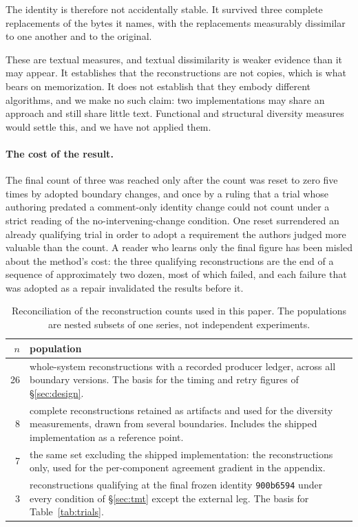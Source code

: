\documentclass[10pt,twocolumn]{article}
\begin{document}
The identity is therefore not accidentally stable. It survived three
complete replacements of the bytes it names, with the replacements
measurably dissimilar to one another and to the original.

These are textual measures, and textual dissimilarity is weaker evidence
than it may appear. It establishes that the reconstructions are not
copies, which is what bears on memorization. It does not establish that
they embody different algorithms, and we make no such claim: two
implementations may share an approach and still share little text.
Functional and structural diversity measures would settle this, and we
have not applied them.

\paragraph{The cost of the result.} The final count of three was reached
only after the count was reset to zero five times by adopted boundary
changes, and once by a ruling that a trial whose authoring predated a
comment-only identity change could not count under a strict reading of
the no-intervening-change condition. One reset surrendered an already
qualifying trial in order to adopt a requirement the authors judged more
valuable than the count. A reader who learns only the final figure has
been misled about the method's cost: the three qualifying reconstructions
are the end of a sequence of approximately two dozen, most of which
failed, and each failure that was adopted as a repair invalidated the
results before it.

\begin{table}[t]
\centering\small
\caption{Reconciliation of the reconstruction counts used in this
paper. The populations are nested subsets of one series, not independent
experiments.}
\label{tab:accounting}
\begin{tabular}{@{}rp{}@{}}
\toprule
$n$ & population \\
\midrule
26 & whole-system reconstructions with a recorded producer ledger,
     across all boundary versions. The basis for the timing and retry
     figures of \S\ref{sec:design}. \\
8  & complete reconstructions retained as artifacts and used for the
     diversity measurements, drawn from several boundaries. Includes the
     shipped implementation as a reference point. \\
7  & the same set excluding the shipped implementation: the
     reconstructions only, used for the per-component agreement
     gradient in the appendix. \\
3  & reconstructions qualifying at the final frozen identity
     \texttt{900b6594} under every condition of \S\ref{sec:tmt} except
     the external leg. The basis for Table~\ref{tab:trials}. \\
\bottomrule
\end{tabular}
\end{table}
\end{document}
